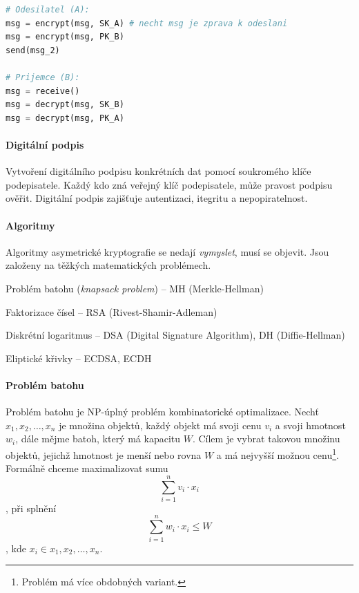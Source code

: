 \bigskip\noindent\begin{minipage}{\linewidth}
\begin{lstlisting}[language=Python, caption={Kombinace klíčů obou stran u~asymetrický kryptografie. Pořadí operací může být i opačné.}]
# Odesilatel (A):
msg = encrypt(msg, SK_A) # necht msg je zprava k odeslani
msg = encrypt(msg, PK_B)
send(msg_2)

# Prijemce (B):
msg = receive()
msg = decrypt(msg, SK_B)
msg = decrypt(msg, PK_A)
\end{lstlisting}
\end{minipage}

\paragraph*{Digitální podpis} Vytvoření digitálního podpisu konkrétních dat pomocí soukromého klíče podepisatele. Každý kdo zná veřejný klíč podepisatele, může pravost podpisu ověřit. Digitální podpis zajišťuje autentizaci, itegritu a nepopiratelnost.

\paragraph*{Algoritmy} Algoritmy asymetrické kryptografie se nedají \textit{vymyslet}, musí se objevit. Jsou založeny na těžkých matematických problémech. \begin{compactitem}
    \item Problém batohu (\textit{knapsack problem}) -- MH (Merkle-Hellman)
    \item Faktorizace čísel -- RSA (Rivest-Shamir-Adleman)
    \item Diskrétní logaritmus -- DSA (Digital Signature Algorithm), DH (Diffie-Hellman)
    \item Eliptické křivky -- ECDSA, ECDH
\end{compactitem}

\paragraph*{Problém batohu} Problém batohu je NP-úplný problém kombinatorické optimalizace. Nechť ${x_1, x_2, \dots, x_n}$ je množina objektů, každý objekt má svoji cenu $v_i$ a svoji hmotnost $w_i$, dále mějme batoh, který má kapacitu $W$. Cílem je vybrat takovou množinu objektů, jejichž hmotnost je menší nebo rovna $W$ a má nejvyšší možnou cenu\footnote{Problém má více obdobných variant.}. Formálně chceme maximalizovat sumu $$ \sum_{i=1}^n v_i \cdot x_i $$, při splnění $$ \sum_{i=1}^n w_i \cdot x_i \leq W $$, kde $x_i \in {x_1, x_2, \dots, x_n}$.

